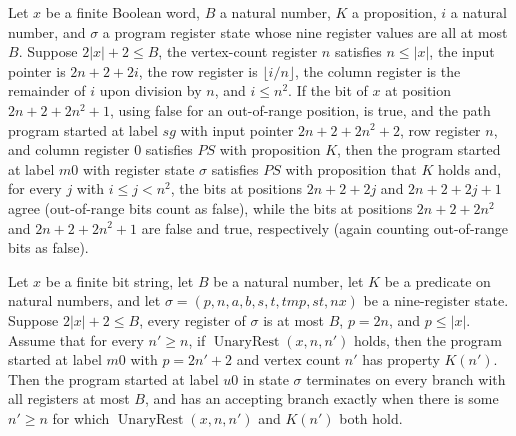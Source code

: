 \begin{lemma}
\label{Complexity.LogProg.ps_mat}
\leanok
{}
Let $x$ be a finite Boolean word, $B$ a natural number, $K$ a proposition, $i$ a natural
number, and $\sigma$ a program register state whose nine register values are all at most
$B$. Suppose $2|x|+2\le B$, the vertex-count register $n$ satisfies $n\le |x|$, the
input pointer is $2n+2+2i$, the row register is $\lfloor i/n\rfloor$, the column
register is the remainder of $i$ upon division by $n$, and $i\le n^2$. If the bit of $x$
at position $2n+2+2n^2+1$, using false for an out-of-range position, is true, and the
path program started at label $sg$ with input pointer $2n+2+2n^2+2$, row register $n$,
and column register $0$ satisfies $PS$ with proposition $K$, then the program started at
label $m0$ with register state $\sigma$ satisfies $PS$ with proposition that $K$ holds
and, for every $j$ with $i\le j<n^2$, the bits at positions $2n+2+2j$ and $2n+2+2j+1$
agree (out-of-range bits count as false), while the bits at positions $2n+2+2n^2$ and
$2n+2+2n^2+1$ are false and true, respectively (again counting out-of-range bits as
false).
\end{lemma}

\begin{lemma}
\label{Complexity.LogProg.ps_unary}
\leanok
{}
Let $x$ be a finite bit string, let $B$ be a natural number, let $K$ be a predicate on
natural numbers, and let $\sigma=(p,n,a,b,s,t,tmp,st,nx)$ be a nine-register state.
Suppose $2|x|+2\le B$, every register of $\sigma$ is at most $B$, $p=2n$, and $p\le
|x|$. Assume that for every $n'\ge n$, if $\operatorname{UnaryRest}(x,n,n')$ holds, then
the program started at label $m0$ with $p=2n'+2$ and vertex count $n'$ has property
$K(n')$. Then the program started at label $u0$ in state $\sigma$ terminates on every
branch with all registers at most $B$, and has an accepting branch exactly when there is
some $n'\ge n$ for which $\operatorname{UnaryRest}(x,n,n')$ and $K(n')$ both hold.
\end{lemma}

